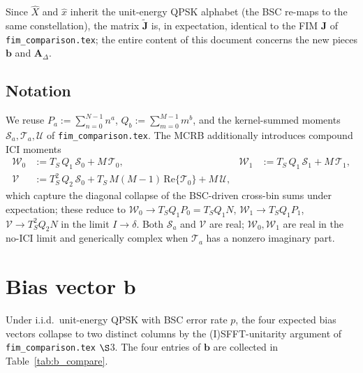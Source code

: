\documentclass[11pt]{article}
\begin{document}
Since \(\hat{X}\) and \(\hat{x}\) inherit the unit-energy QPSK alphabet (the BSC re-maps to the same constellation), the matrix \(\tilde{\bm{J}}\) is, in expectation, identical to the FIM \(\bm{J}\) of \texttt{fim\_comparison.tex}; the entire content of this document concerns the new pieces \(\bm{b}\) and \(\bm{A}_\Delta\).

\subsection*{Notation}

We reuse \(P_a := \sum_{n=0}^{N-1} n^a\), \(Q_b := \sum_{m=0}^{M-1} m^b\), and the kernel-summed moments \(\mathcal{S}_a, \mathcal{T}_a, \mathcal{U}\) of \texttt{fim\_comparison.tex}. The MCRB additionally introduces compound ICI moments
\begin{align}
    \mathcal{W}_0 &:= T_S\, Q_1\, \mathcal{S}_0 + M\, \mathcal{T}_0, &
    \mathcal{W}_1 &:= T_S\, Q_1\, \mathcal{S}_1 + M\, \mathcal{T}_1, \\
    \mathcal{V}   &:= T_S^2\, Q_2\, \mathcal{S}_0 + T_S\, M(M-1)\, \mathrm{Re}\{\mathcal{T}_0\} + M\, \mathcal{U}, & &
\end{align}
which capture the diagonal collapse of the BSC-driven cross-bin sums under expectation; these reduce to \(\mathcal{W}_0 \to T_S Q_1 P_0 = T_S Q_1 N\), \(\mathcal{W}_1 \to T_S Q_1 P_1\), \(\mathcal{V} \to T_S^2 Q_2 N\) in the limit \(I \to \delta\). Both \(\mathcal{S}_a\) and \(\mathcal{V}\) are real; \(\mathcal{W}_0, \mathcal{W}_1\) are real in the no-ICI limit and generically complex when \(\mathcal{T}_a\) has a nonzero imaginary part.

\section{Bias vector \texorpdfstring{\(\bm{b}\)}{b}}

Under i.i.d.\ unit-energy QPSK with BSC error rate \(p\), the four expected bias vectors collapse to two distinct columns by the (I)SFFT-unitarity argument of \texttt{fim\_comparison.tex} \(\S\)3. The four entries of \(\bm{b}\) are collected in Table~\ref{tab:b_compare}.
\end{document}
